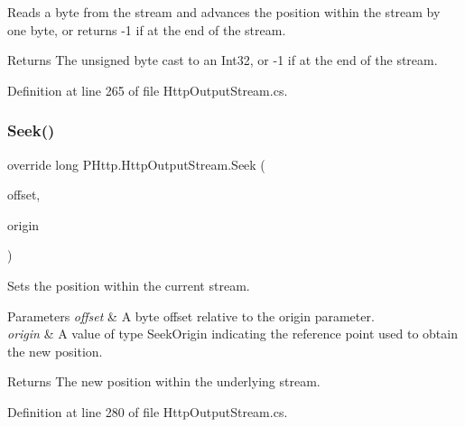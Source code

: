 Reads a byte from the stream and advances the position within the stream by one byte, or returns -\/1 if at the end of the stream. 

\begin{DoxyReturn}{Returns}
The unsigned byte cast to an Int32, or -\/1 if at the end of the stream.
\end{DoxyReturn}


Definition at line 265 of file Http\+Output\+Stream.\+cs.

\mbox{\label{class_p_http_1_1_http_output_stream_ae15f3bb25db9f145175e0b870263feb5}} 
\subsubsection{\texorpdfstring{Seek()}{Seek()}}
{\footnotesize\ttfamily override long P\+Http.\+Http\+Output\+Stream.\+Seek (\begin{DoxyParamCaption}\item[{long}]{offset,  }\item[{Seek\+Origin}]{origin }\end{DoxyParamCaption})}



Sets the position within the current stream. 


\begin{DoxyParams}{Parameters}
{\em offset} & A byte offset relative to the origin parameter.\\
\hline
{\em origin} & A value of type Seek\+Origin indicating the reference point used to obtain the new position. \\
\hline
\end{DoxyParams}
\begin{DoxyReturn}{Returns}
The new position within the underlying stream.
\end{DoxyReturn}


Definition at line 280 of file Http\+Output\+Stream.\+cs.

\mbox{\label{class_p_http_1_1_http_output_stream_adc9a34660dcab180636813dfd7bba7b2}} 
